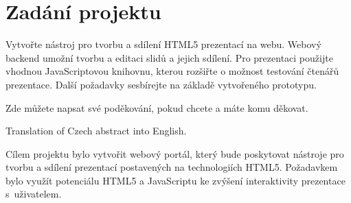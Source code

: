 \documentclass[11pt,twoside,a4paper]{book}
\begin{document}
	
	\translate				%

	{
	 \cleardoublepage \thispagestyle{empty}
	\chapter*{Zadání projektu}
	Vytvořte nástroj pro tvorbu a sdílení HTML5 prezentací na webu. Webový backend umožní  tvorbu a editaci slidů a jejich sdílení. Pro prezentaci použijte vhodnou JavaScriptovou knihovnu, kterou rozšiřte o možnost testování čtenářů prezentace. Další požadavky sesbírejte na základě vytvořeného prototypu.
	\newpage
	}

	\coverpagestarts


	\acknowledgements
	\noindent
	Zde můžete napsat své poděkování, pokud chcete a máte komu děkovat.





 
	\abstractpage

	Translation of Czech abstract into English.


	\baselineskip

	\noindent
	Cílem projektu bylo vytvořit webový portál, který bude poskytovat nástroje pro tvorbu a sdílení prezentací postavených na technologiích HTML5. Požadavkem bylo využít potenciálu HTML5 a JavaScriptu ke zvýšení interaktivity prezentace s~uživatelem.

	\tableofcontents		%
\end{document}
